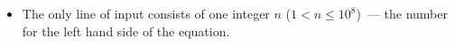 

\begin{itemize}
  \item The only line of input consists of one integer $n$ ($1 < n \le
      10^8$)~--- the number for the left hand side of the equation.
\end{itemize}

